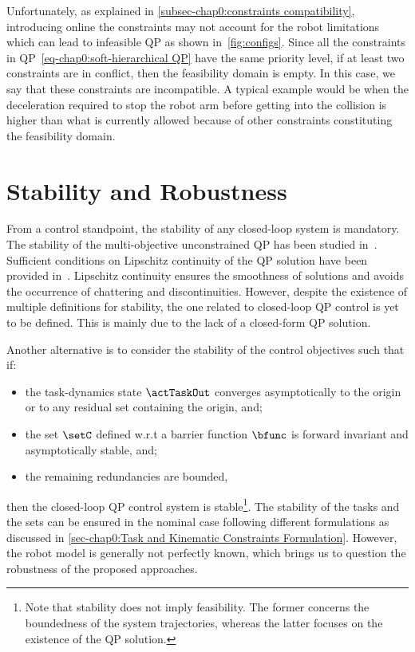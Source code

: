 Unfortunately, as explained in \cref{subsec-chap0:constraints compatibility}, introducing online the constraints may not account for the robot limitations which can lead to infeasible QP  as shown in~\cref{fig:configs}. Since all the constraints in QP~\cref{eq-chap0:soft-hierarchical QP} have the same priority level, if at least two constraints are in conflict, then the feasibility domain is empty. In this case, we say that these constraints are incompatible. A typical example would be when the deceleration required to stop the robot arm before getting into the collision is higher than what is currently allowed because of other constraints constituting the feasibility domain.%
\section{Stability and Robustness}
From a control standpoint, the stability of any closed-loop system is mandatory.   The stability of the multi-objective unconstrained QP has been studied in~\cite{bouyarmane2018tac}. Sufficient conditions on Lipschitz continuity of the QP solution have been provided in~\cite{morris2013cdc}. Lipschitz continuity ensures the smoothness of solutions and avoids the occurrence of chattering and discontinuities. However, despite the existence of multiple definitions for stability, the one related to closed-loop QP control  is yet to be defined. This is mainly due to the lack of a closed-form QP solution. 

Another alternative is to consider the stability of the control objectives such that if:
\begin{itemize}
	\item the task-dynamics state $\actTaskOut$ converges asymptotically to the origin or to any residual set containing the origin, and;
	\item the set $\setC$ defined w.r.t a barrier function $\bfunc$ is forward invariant and asymptotically stable, and;
	\item the remaining redundancies are bounded,
\end{itemize} 
then the closed-loop QP control system is stable\footnote{Note that stability does not imply feasibility. The former concerns the boundedness of the system trajectories, whereas the latter focuses on the existence of the QP solution.}. The stability of the tasks and the sets can be ensured in the nominal case following different formulations as discussed in \cref{sec-chap0:Task and Kinematic Constraints Formulation}. However, the robot model is generally not perfectly known, which brings us to question the robustness of the proposed approaches. %

